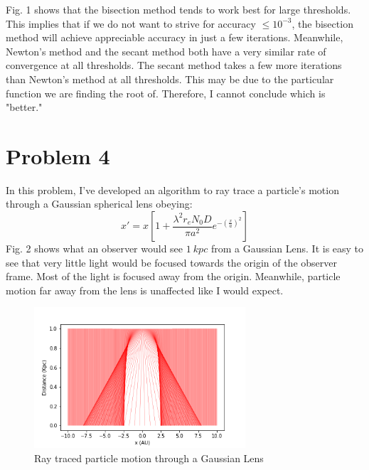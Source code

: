 \documentclass[12pt, letterpaper]{article}
\begin{document}
Fig. 1 shows that the bisection method tends to work best for large thresholds. This implies that if we do not want to strive for accuracy  $\leq 10^{-3}$, the bisection method will achieve appreciable accuracy in just a few iterations.  Meanwhile, Newton's method and the secant method both have a very similar rate of convergence at all thresholds. The secant method takes a few more iterations than Newton's method at all thresholds. This may be due to the particular function we are finding the root of. Therefore, I cannot conclude which is "better." 

\section{Problem 4}
In this problem, I've developed an algorithm to ray trace a particle's motion through a Gaussian spherical lens obeying:
\begin{equation}
x' = x [1 + \frac{\lambda^2 r_e N_0 D}{\pi a^2} e^{-(\frac{x}{a})^2}]
\end{equation}
Fig. 2 shows what an observer would see $1\ kpc$ from a Gaussian Lens.  It is easy to see that very little light would be focused towards the origin of the observer frame. Most of the light is focused away from the origin. Meanwhile, particle motion far away from the lens is unaffected like I would expect.
\begin{figure}[h]
\caption{Ray traced particle motion through a Gaussian Lens}
\centering
\includegraphics[width=0.7\textwidth]{gaussian_lense}
\end{figure}
\end{document}
